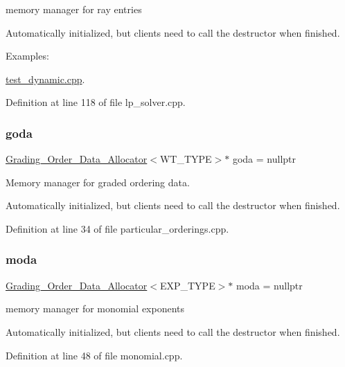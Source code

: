 memory manager for ray entries 

Automatically initialized, but clients need to call the destructor when finished. \begin{Desc}
\item[Examples\+: ]\par
\hyperlink{test_dynamic_8cpp-example}{test\+\_\+dynamic.\+cpp}.\end{Desc}


Definition at line 118 of file lp\+\_\+solver.\+cpp.

\mbox{\label{group__memorygroup_gadf1bccf09eada41d10a5d4ceda7ca479}} 
\subsubsection{\texorpdfstring{goda}{goda}}
{\footnotesize\ttfamily \hyperlink{group__memorygroup_class_grading___order___data___allocator}{Grading\+\_\+\+Order\+\_\+\+Data\+\_\+\+Allocator}$<$W\+T\+\_\+\+T\+Y\+PE$>$$\ast$ goda = nullptr}



Memory manager for graded ordering data. 

Automatically initialized, but clients need to call the destructor when finished. 

Definition at line 34 of file particular\+\_\+orderings.\+cpp.

\mbox{\label{group__memorygroup_gaf2c367d23e09c5dad7e0273995a3304c}} 
\subsubsection{\texorpdfstring{moda}{moda}}
{\footnotesize\ttfamily \hyperlink{group__memorygroup_class_grading___order___data___allocator}{Grading\+\_\+\+Order\+\_\+\+Data\+\_\+\+Allocator}$<$E\+X\+P\+\_\+\+T\+Y\+PE$>$$\ast$ moda = nullptr}



memory manager for monomial exponents 

Automatically initialized, but clients need to call the destructor when finished. 

Definition at line 48 of file monomial.\+cpp.

